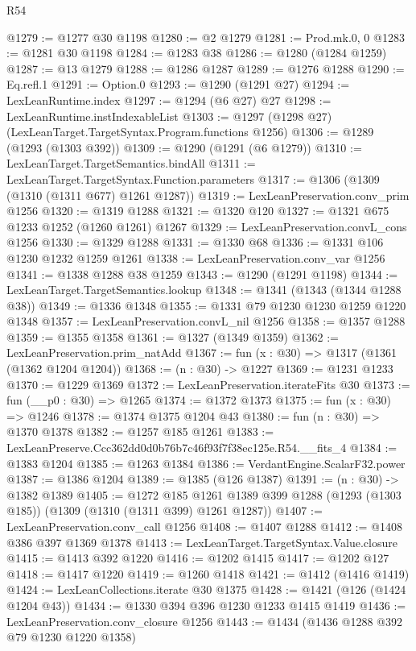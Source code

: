 \begin{lexlean}{R54}
\begin{coremodule}
@1279 := @1277 @30 @1198
@1280 := @2 @1279
@1281 := Prod.mk.{0, 0}
@1283 := @1281 @30 @1198
@1284 := @1283 @38
@1286 := @1280 (@1284 @1259)
@1287 := @13 @1279
@1288 := @1286 @1287
@1289 := @1276 @1288
@1290 := Eq.refl.{1}
@1291 := Option.{0}
@1293 := @1290 (@1291 @27)
@1294 := LexLeanRuntime.index
@1297 := @1294 (@6 @27) @27
@1298 := LexLeanRuntime.instIndexableList
@1303 := @1297 (@1298 @27) (LexLeanTarget.TargetSyntax.Program.functions @1256)
@1306 := @1289 (@1293 (@1303 @392))
@1309 := @1290 (@1291 (@6 @1279))
@1310 := LexLeanTarget.TargetSemantics.bindAll
@1311 := LexLeanTarget.TargetSyntax.Function.parameters
@1317 := @1306 (@1309 (@1310 (@1311 @677) @1261 @1287))
@1319 := LexLeanPreservation.conv_prim @1256
@1320 := @1319 @1288
@1321 := @1320 @120
@1327 := @1321 @675 @1233 @1252 (@1260 @1261) @1267
@1329 := LexLeanPreservation.convL_cons @1256
@1330 := @1329 @1288
@1331 := @1330 @68
@1336 := @1331 @106 @1230 @1232 @1259 @1261
@1338 := LexLeanPreservation.conv_var @1256
@1341 := @1338 @1288 @38 @1259
@1343 := @1290 (@1291 @1198)
@1344 := LexLeanTarget.TargetSemantics.lookup
@1348 := @1341 (@1343 (@1344 @1288 @38))
@1349 := @1336 @1348
@1355 := @1331 @79 @1230 @1230 @1259 @1220 @1348
@1357 := LexLeanPreservation.convL_nil @1256
@1358 := @1357 @1288
@1359 := @1355 @1358
@1361 := @1327 (@1349 @1359)
@1362 := LexLeanPreservation.prim_natAdd
@1367 := fun (x : @30) => @1317 (@1361 (@1362 @1204 @1204))
@1368 := (n : @30) -> @1227
@1369 := @1231 @1233
@1370 := @1229 @1369
@1372 := LexLeanPreservation.iterateFits @30
@1373 := fun (__p0 : @30) => @1265
@1374 := @1372 @1373
@1375 := fun (x : @30) => @1246
@1378 := @1374 @1375 @1204 @43
@1380 := fun (n : @30) => @1370 @1378
@1382 := @1257 @185 @1261
@1383 := LexLeanPreserve.Ccc362dd0d0b76b7c46f93f7f38ec125e.R54.__fits_4
@1384 := @1383 @1204
@1385 := @1263 @1384
@1386 := VerdantEngine.ScalarF32.power
@1387 := @1386 @1204
@1389 := @1385 (@126 @1387)
@1391 := (n : @30) -> @1382 @1389
@1405 := @1272
    @185
    @1261
    @1389
    @399
    @1288
    (@1293 (@1303 @185))
    (@1309 (@1310 (@1311 @399) @1261 @1287))
@1407 := LexLeanPreservation.conv_call @1256
@1408 := @1407 @1288
@1412 := @1408 @386 @397 @1369 @1378
@1413 := LexLeanTarget.TargetSyntax.Value.closure
@1415 := @1413 @392 @1220
@1416 := @1202 @1415
@1417 := @1202 @127
@1418 := @1417 @1220
@1419 := @1260 @1418
@1421 := @1412 (@1416 @1419)
@1424 := LexLeanCollections.iterate @30 @1375
@1428 := @1421 (@126 (@1424 @1204 @43))
@1434 := @1330 @394 @396 @1230 @1233 @1415 @1419
@1436 := LexLeanPreservation.conv_closure @1256
@1443 := @1434 (@1436 @1288 @392 @79 @1230 @1220 @1358)

\end{coremodule}
\end{lexlean}
